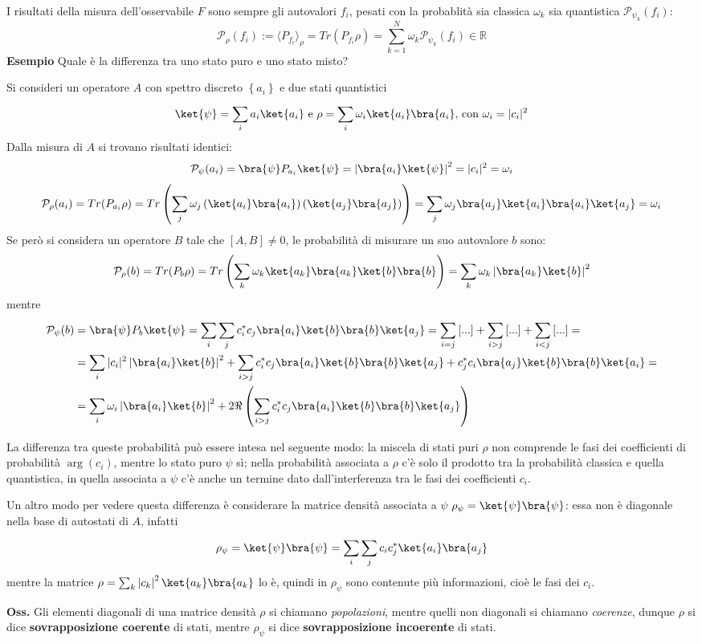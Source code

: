 I risultati della misura dell'osservabile $F$ sono sempre gli autovalori $f_i$, pesati con la probablità
sia classica $\omega_k$ sia quantistica $\mathcal{P}_{\psi_k}(f_i)$:
$$\mathcal{P}_\rho(f_i) := \langle P_{f_i}\rangle_\rho = Tr(P_{f_i}\rho) = 
\sum_{k=1}^{N}\omega_k \mathcal{P}_{\psi_k}(f_i)\in\mathbb{R}$$
\textbf{Esempio} Quale è la differenza tra uno stato puro e uno stato misto?

Si consideri un operatore $A$ con spettro discreto $\left\{a_i\right\}$ e due stati quantistici
$$\ket{\psi} = \sum_{i}^{}a_i\ket{a_i} \text{ e } \rho = \sum_{i}^{}\omega_i\ket{a_i}\bra{a_i}
\text{, con } \omega_i = |c_i|^2
$$
Dalla misura di $A$ si trovano risultati identici:
$$\mathcal{P}_\psi(a_i) = \bra{\psi}P_{a_i}\ket{\psi} = \left|\bra{a_i}\ket{\psi}\right|^2 =
|c_i|^2 = \omega_i$$
$$\mathcal{P}_\rho(a_i) = Tr(P_{a_i}\rho) =
Tr\left( \sum_{j}^{}\omega_j \left( \ket{a_i}\bra{a_i}\right)\left(\ket{a_j}\bra{a_j}\right) \right) = 
\sum_{j}^{}\omega_j \bra{a_j}\ket{a_i}\bra{a_i}\ket{a_j} = \omega_i
$$
Se però si considera un operatore $B$ tale che $\left[A,B\right] \neq0$, le probabilità di misurare un suo
autovalore $b$ sono:
$$\mathcal{P}_\rho(b) = Tr(P_b\rho) = Tr\left( \sum_{k}^{}\omega_k\ket{a_k}\bra{a_k}\ket{b}\bra{b}\right)=
\sum_{k}^{}\omega_k\left|\bra{a_k}\ket{b}\right|^2
$$
mentre
\begin{align*}
    \mathcal{P}_\psi(b)&=\bra{\psi}P_b\ket{\psi}=
    \sum_{i}^{}\sum_{j}c_i^*c_j\bra{a_i}\ket{b}\bra{b}\ket{a_j} =
    \sum_{i=j}\left[...\right] +\sum_{i>j}\left[...\right]+\sum_{i<j}\left[...\right] = \\
    &=\sum_{i}|c_i|^2\left|\bra{a_i}\ket{b}\right|^2 +
    \sum_{i>j}c_i^*c_j\bra{a_i}\ket{b}\bra{b}\ket{a_j} + c_j^*c_i\bra{a_j}\ket{b}\bra{b}\ket{a_i}=\\
    &=\sum_{i}\omega_i\left|\bra{a_i}\ket{b}\right|^2 +
    2\Re\left( \sum_{i>j} c_i^*c_j\bra{a_i}\ket{b}\bra{b}\ket{a_j}\right) 
\end{align*}

La differenza tra queste probabilità può essere intesa nel seguente modo: la miscela di stati puri $\rho$
non comprende le fasi dei coefficienti di probabilità $\arg(c_i)$, mentre lo stato puro $\psi$ sì; nella
probabilità associata a $\rho$ c'è solo il prodotto tra la probabilità classica e quella quantistica, 
in quella associata a $\psi$ c'è anche un termine dato dall'interferenza tra le fasi dei coefficienti
$c_i$.

Un altro modo per vedere questa differenza è considerare la matrice densità associata a $\psi$
$\rho_\psi = \ket{\psi}\bra{\psi}$: essa non è diagonale nella base di autostati di $A$, infatti
$$\rho_\psi = \ket{\psi}\bra{\psi} = \sum_{i}\sum_{j}^{}c_ic_j^*\ket{a_i}\bra{a_j}$$
mentre la matrice $\rho = \sum_{k}\left|c_k\right|^2\ket{a_k}\bra{a_k}$ lo è, quindi in $\rho_\psi$ sono
contenute più informazioni, cioè le fasi dei $c_i$.

\textbf{Oss.} Gli elementi diagonali di una matrice densità $\rho$ si chiamano \textit{popolazioni}, 
mentre quelli non diagonali si chiamano \textit{coerenze}, dunque $\rho$ si dice
\textbf{sovrapposizione coerente} di stati, mentre $\rho_\psi$ si dice
\textbf{sovrapposizione incoerente} di stati.

